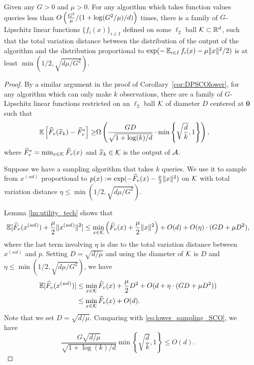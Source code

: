 \begin{corollary}
\label{cor:Samplinglower}
Given any $G > 0$ and $\mu > 0$. For any algorithm which takes function values queries less than $O\left(\frac{G^2}{\mu}/(1+\log(G^2/\mu)/d)\right)$ times, there is a family of $G$-Lipschitz linear functions $\{f_i(x)\}_{i\in I}$ defined on some $\ell_2$ ball $\mathcal K\subset\mathbb{R}^d$, such that the total variation distance between the distribution of the output of the algorithm and the distribution proportional to $\exp(-\operatorname*{\mathbb{E}}_{i\in I}f_i(x)-\mu \|x\|^2 / 2)$ is at least $\min(1/2, \sqrt{d \mu / G^2})$.
\end{corollary}
\begin{proof}
By a similar argument in the proof of Corollary~\ref{cor:DPSCOlower}, for any algorithm which can only make $k$ observations, there are a family of $G$-Lipschitz linear functions restricted on an $\ell_2$ ball $\mathcal K$ of diameter $D$ centered at $\mathbf{0}$ such that  
\begin{align}
\label{eq:lower_sampling_SCO}
    \operatorname*{\mathbb{E}}\Big[\widehat{F}_v(\widehat{x}_k)-\widehat{F}_v^*\Big]
    \ge&\Omega\left( \frac{G D}{\sqrt{1+\log(k)/d}} \cdot \min\left\{ \sqrt{\frac{d}{k}},1\right\} \right),
\end{align}
where $\widehat{F}_v^*=\min_{x\in\mathcal K}\widehat{F}_v(x)$ and $\widehat{x}_k\in\mathcal K$ is the output of $\mathcal A$.

Suppose we have a sampling algorithm that takes $k$ queries. We use it to sample from $x^{(sol)}$ proportional to $p(x):=\exp(-\widehat{F}_v(x)-\frac{\mu}{2} \|x\|^2)$ on $\mathcal K$ with total variation distance $\eta\leq \min(1/2, \sqrt{d \mu / G^2})$. 

Lemma \ref{lm:utility_tech} shows that
\begin{align*}
    \operatorname*{\mathbb{E}}[\widehat{F}_{v}(x^{(sol)})+\frac{\mu}{2}\|x^{(sol)}\|^{2}]\leq\min_{x\in \mathcal K}\left(\widehat{F}_{v}(x)+\frac{\mu}{2}\|x\|^{2}\right)+O(d) + O(\eta) \cdot (GD+\mu D^2),
\end{align*}
where the last term involving $\eta$ is due to the total variation distance between $x^{(sol)}$ and $p$. Setting $D=\sqrt{d/\mu}$ and using the diameter of $\mathcal K$ is $D$ and $\eta \leq \min(1/2, \sqrt{d \mu / G^2})$, we have
\begin{align*}
\operatorname*{\mathbb{E}}[\widehat{F}_{v}(x^{(sol)})] & \leq\min_{x\in\mathcal K}\widehat{F}_{v}(x)+\frac{\mu}{2}D^{2}+O(d+\eta\cdot (GD+\mu D^2))\\
& \leq \min_{x\in\mathcal K}\widehat{F}_{v}(x)+O(d).
\end{align*}
Note that we set $D = \sqrt{d/\mu}$. Comparing with \eqref{eq:lower_sampling_SCO}, we have
\[
\frac{G\sqrt{d/\mu}}{\sqrt{1+\log(k)/d}}\min\left\{ \sqrt{\frac{d}{k}},1\right\} \leq O(d).
\]


\end{proof}
